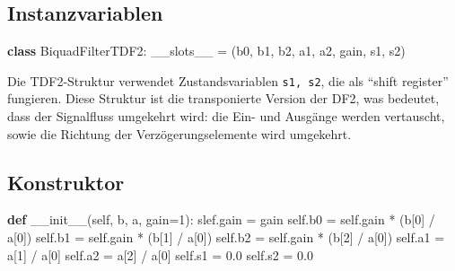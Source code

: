 \documentclass[
  ngerman,
  letterpaper,
  DIV=11]{scrreprt}
\newenvironment{Shaded}{\begin{snugshade}}{\end{snugshade}}
\newcommand{\DecValTok}[1]{\textcolor[rgb]{0.68,0.00,0.00}{#1}}
\newcommand{\FloatTok}[1]{\textcolor[rgb]{0.68,0.00,0.00}{#1}}
\newcommand{\FunctionTok}[1]{\textcolor[rgb]{0.28,0.35,0.67}{#1}}
\newcommand{\KeywordTok}[1]{\textcolor[rgb]{0.00,0.23,0.31}{\textbf{#1}}}
\newcommand{\NormalTok}[1]{\textcolor[rgb]{0.00,0.23,0.31}{#1}}
\newcommand{\OperatorTok}[1]{\textcolor[rgb]{0.37,0.37,0.37}{#1}}
\newcommand{\StringTok}[1]{\textcolor[rgb]{0.13,0.47,0.30}{#1}}
\newcommand{\VariableTok}[1]{\textcolor[rgb]{0.07,0.07,0.07}{#1}}
\begin{document}
\subsection{Instanzvariablen}\label{instanzvariablen-2}

\begin{Shaded}
\begin{Highlighting}[]
\KeywordTok{class}\NormalTok{ BiquadFilterTDF2:}
    \VariableTok{\_\_slots\_\_} \OperatorTok{=}\NormalTok{ (}\StringTok{\textquotesingle{}b0\textquotesingle{}}\NormalTok{, }\StringTok{\textquotesingle{}b1\textquotesingle{}}\NormalTok{, }\StringTok{\textquotesingle{}b2\textquotesingle{}}\NormalTok{, }\StringTok{\textquotesingle{}a1\textquotesingle{}}\NormalTok{, }\StringTok{\textquotesingle{}a2\textquotesingle{}}\NormalTok{, }\StringTok{\textquotesingle{}gain\textquotesingle{}}\NormalTok{, }\StringTok{\textquotesingle{}s1\textquotesingle{}}\NormalTok{, }\StringTok{\textquotesingle{}s2\textquotesingle{}}\NormalTok{)}
\end{Highlighting}
\end{Shaded}

Die TDF2-Struktur verwendet Zustandsvariablen \texttt{s1,\ s2}, die als
``shift register'' fungieren. Diese Struktur ist die transponierte
Version der DF2, was bedeutet, dass der Signalfluss umgekehrt wird: die
Ein- und Ausgänge werden vertauscht, sowie die Richtung der
Verzögerungselemente wird umgekehrt.

\subsection{Konstruktor}\label{konstruktor-5}

\begin{Shaded}
\begin{Highlighting}[]
   \KeywordTok{def} \FunctionTok{\_\_init\_\_}\NormalTok{(}\VariableTok{self}\NormalTok{, b, a, gain}\OperatorTok{=}\DecValTok{1}\NormalTok{):}
\NormalTok{        slef.gain }\OperatorTok{=}\NormalTok{ gain}
        \VariableTok{self}\NormalTok{.b0 }\OperatorTok{=} \VariableTok{self}\NormalTok{.gain }\OperatorTok{*}\NormalTok{ (b[}\DecValTok{0}\NormalTok{] }\OperatorTok{/}\NormalTok{ a[}\DecValTok{0}\NormalTok{])}
        \VariableTok{self}\NormalTok{.b1 }\OperatorTok{=} \VariableTok{self}\NormalTok{.gain }\OperatorTok{*}\NormalTok{ (b[}\DecValTok{1}\NormalTok{] }\OperatorTok{/}\NormalTok{ a[}\DecValTok{0}\NormalTok{])}
        \VariableTok{self}\NormalTok{.b2 }\OperatorTok{=} \VariableTok{self}\NormalTok{.gain }\OperatorTok{*}\NormalTok{ (b[}\DecValTok{2}\NormalTok{] }\OperatorTok{/}\NormalTok{ a[}\DecValTok{0}\NormalTok{])}
        \VariableTok{self}\NormalTok{.a1 }\OperatorTok{=}\NormalTok{ a[}\DecValTok{1}\NormalTok{] }\OperatorTok{/}\NormalTok{ a[}\DecValTok{0}\NormalTok{]}
        \VariableTok{self}\NormalTok{.a2 }\OperatorTok{=}\NormalTok{ a[}\DecValTok{2}\NormalTok{] }\OperatorTok{/}\NormalTok{ a[}\DecValTok{0}\NormalTok{]}
        \VariableTok{self}\NormalTok{.s1 }\OperatorTok{=} \FloatTok{0.0}
        \VariableTok{self}\NormalTok{.s2 }\OperatorTok{=} \FloatTok{0.0}
\end{Highlighting}
\end{Shaded}
\end{document}
